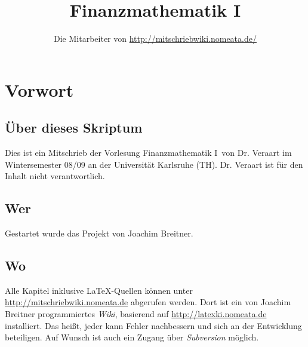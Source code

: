 \documentclass[a4paper,twoside,DIV15,BCOR12mm]{scrbook}
\author{Die Mitarbeiter von \url{http://mitschriebwiki.nomeata.de/}}
\title{Finanzmathematik I}
\begin{document}
\maketitle
 
\newenvironment{enuma}{%
\begin{enumerate}[\hspace{1em}a)]%
}{%
\end{enumerate}%
}

\newenvironment{enumi}{%
\begin{enumerate}[\hspace{1em}i)]%
}{%
\end{enumerate}%
}

\setcounter{secnumdepth}{-1}
\tableofcontents


\chapter{Vorwort}
\setcounter{secnumdepth}{2}

\section*{Über dieses Skriptum}
Dies ist ein Mitschrieb der Vorlesung \glqq Finanzmathematik I\grqq\ von Dr. Veraart im
Wintersemester 08/09 an der Universität Karlsruhe (TH).
Dr. Veraart ist für  den Inhalt nicht verantwortlich.
\section*{Wer}
Gestartet wurde das Projekt von Joachim Breitner.

\section*{Wo}
Alle Kapitel inklusive \LaTeX-Quellen können unter \url{http://mitschriebwiki.nomeata.de} abgerufen werden.
Dort ist ein von Joachim Breitner programmiertes \emph{Wiki}, basierend auf \url{http://latexki.nomeata.de} installiert. 
Das heißt, jeder kann Fehler nachbessern und sich an der Entwicklung
beteiligen. Auf Wunsch ist auch ein Zugang über \emph{Subversion} möglich.
\end{document}
